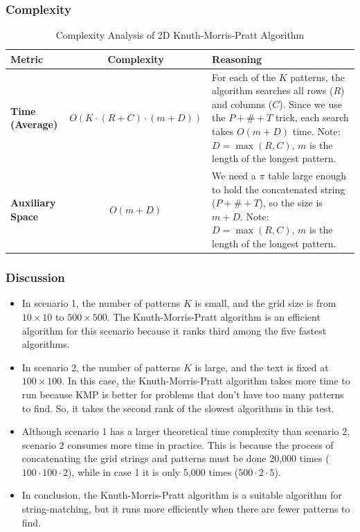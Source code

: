     \subsubsection{Complexity}
    \begin{table}[H]
    \centering
    \renewcommand{\arraystretch}{1.5}
    \begin{tabular}{|l|c|p{8cm}|}
    \hline
    \textbf{Metric} & \textbf{Complexity} & \textbf{Reasoning} \\ \hline
    \textbf{Time (Average)} & $O(K \cdot (R + C) \cdot (m + D))$ & For each of the $K$ patterns, the algorithm searches all rows ($R$) and columns ($C$). Since we use the $P + \# + T$ trick, each search takes $O(m + D)$ time. 
    Note: $D = \max(R, C)$, $m$ is the length of the longest pattern. \\ 
    \hline
    \textbf{Auxiliary Space} & $O(m + D)$ & We need a $\pi$ table large enough to hold the concatenated string ($P + \# + T$), so the size is $m + D$.
    Note: $D = \max(R, C)$, $m$ is the length of the longest pattern. \\
    \hline
    \end{tabular}
    \caption{Complexity Analysis of 2D Knuth-Morris-Pratt Algorithm}
    \end{table}

    \subsubsection{Discussion}
    \begin{itemize}
        \item In scenario 1, the number of patterns $K$ is small, and the grid size is from $10 \times 10$ to $500 \times 500$. 
        The Knuth-Morris-Pratt algorithm is an efficient algorithm for this scenario because it ranks third among the five fastest algorithms. 
        \item In scenario 2, the number of patterns $K$ is large, and the text is fixed at $100 \times 100$. 
        In this case, the Knuth-Morris-Pratt algorithm takes more time to run because KMP is better for problems that don't have too many patterns to find. 
        So, it takes the second rank of the slowest algorithms in this test.
        \item Although scenario 1 has a larger theoretical time complexity than scenario 2, scenario 2 consumes more time in practice. 
        This is because the process of concatenating the grid strings and patterns must be done 20,000 times ($100 \cdot 100 \cdot 2$), while in case 1 it is only 5,000 times ($500 \cdot 2 \cdot 5$).
        \item In conclusion, the Knuth-Morris-Pratt algorithm is a suitable algorithm for string-matching, but it runs more efficiently when there are fewer patterns to find.
    \end{itemize}
        